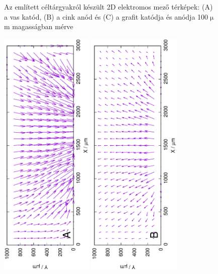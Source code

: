 \begin{figure}
\caption{Az említett céltárgyakról készült 2D elektromos mező térképek:
(A) a vas katód, (B) a cink anód és (C) a grafit katódja és anódja 100$\upmu$m magasságban mérve}
\label{fig:field_h1}
\end{figure}

\begin{figure}
\centering
\includegraphics[width=0.4\textwidth, angle=-90]{img/mérések/Fe1_v.eps}
\includegraphics[width=0.4\textwidth, angle=-90]{img/mérések/Zn1_v.eps}

\end{figure}
